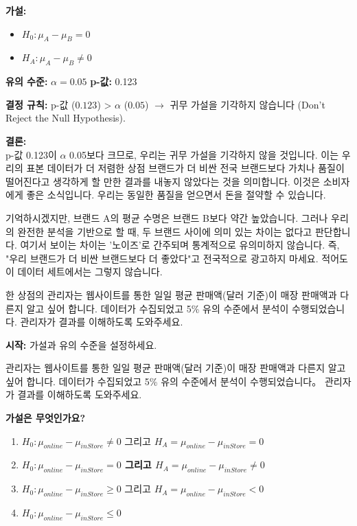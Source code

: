\documentclass[11pt,a4paper]{article}
\theoremstyle{definition}
\begin{document}
\begin{infobox}[title=두 브랜드 비교 (8/8): 4단계 - 귀무 가설 기각 여부 결정]
\textbf{가설:}
\begin{itemize}
    \item $H_0 : \mu_A - \mu_B = 0$
    \item $H_A : \mu_A - \mu_B \neq 0$
\end{itemize}
\textbf{유의 수준:} $\alpha = 0.05$
\textbf{p-값:} 0.123

\textbf{결정 규칙:}
p-값 ($0.123$) > $\alpha$ ($0.05$) $\rightarrow$ 귀무 가설을 기각하지 않습니다 (Don't Reject the Null Hypothesis).

\textbf{결론:} \\
p-값 0.123이 $\alpha$ 0.05보다 크므로, 우리는 귀무 가설을 기각하지 않을 것입니다.
이는 우리의 표본 데이터가 더 저렴한 상점 브랜드가 더 비싼 전국 브랜드보다 가치나 품질이 떨어진다고 생각하게 할 만한 결과를 내놓지 않았다는 것을 의미합니다. 이것은 소비자에게 좋은 소식입니다. 우리는 동일한 품질을 얻으면서 돈을 절약할 수 있습니다.

기억하시겠지만, 브랜드 A의 평균 수명은 브랜드 B보다 약간 높았습니다. 그러나 우리의 완전한 분석을 기반으로 할 때, 두 브랜드 사이에 의미 있는 차이는 없다고 판단합니다. 여기서 보이는 차이는 '노이즈'로 간주되며 통계적으로 유의미하지 않습니다. 즉, "우리 브랜드가 더 비싼 브랜드보다 더 좋았다"고 전국적으로 광고하지 마세요. 적어도 이 데이터 세트에서는 그렇지 않습니다.
\end{infobox}

\begin{examplebox}[title=연습 문제: 온라인 vs. 매장 판매 - 문제 상황]
한 상점의 관리자는 웹사이트를 통한 일일 평균 판매액(달러 기준)이 매장 판매액과 다른지 알고 싶어 합니다. 데이터가 수집되었고 5\% 유의 수준에서 분석이 수행되었습니다. 관리자가 결과를 이해하도록 도와주세요.

\textbf{시작:} 가설과 유의 수준을 설정하세요.
\end{examplebox}

\begin{infobox}[title=연습 문제: 가설은 무엇인가요? (선택)]
관리자는 웹사이트를 통한 일일 평균 판매액(달러 기준)이 매장 판매액과 다른지 알고 싶어 합니다. 데이터가 수집되었고 5\% 유의 수준에서 분석이 수행되었습니다。 관리자가 결과를 이해하도록 도와주세요.

\textbf{가설은 무엇인가요?}
\begin{enumerate}
    \item $H_0 : \mu_{online} - \mu_{inStore} \neq 0$ 그리고 $H_A = \mu_{online} - \mu_{inStore} = 0$
    \item \textbf{$H_0 : \mu_{online} - \mu_{inStore} = 0$ 그리고 $H_A = \mu_{online} - \mu_{inStore} \neq 0$}
    \item $H_0 : \mu_{online} - \mu_{inStore} \ge 0$ 그리고 $H_A = \mu_{online} - \mu_{inStore} < 0$
    \item $H_0 : \mu_{online} - \mu_{inStore} \le 0$
\end{enumerate}
\end{infobox}
\end{document}
